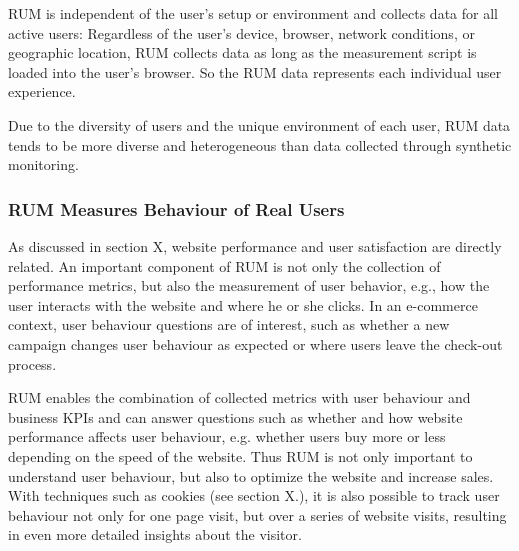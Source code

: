 
RUM is independent of the user's setup or environment and collects data for all active users:
Regardless of the user's device, browser, network conditions, or geographic location, RUM collects data as long as the measurement script is loaded into the user's browser.%
So the RUM data represents each individual user experience. %

Due to the diversity of users and the unique environment of each user, RUM data tends to be more diverse and heterogeneous than data collected through synthetic monitoring. %


\subsubsection{RUM Measures Behaviour of Real Users} %



As discussed in section X, website performance and user satisfaction are directly related.
An important component of RUM is not only the collection of performance metrics, but also the measurement of user behavior, e.g., how the user interacts with the website and where he or she clicks. %
In an e-commerce context, user behaviour questions are of interest, such as whether a new campaign changes user behaviour as expected or where users leave the check-out process. %

RUM enables the combination of collected metrics with user behaviour and business KPIs and can answer questions such as whether and how website performance affects user behaviour, e.g. whether users buy more or less depending on the speed of the website. %
Thus RUM is not only important to understand user behaviour, but also to optimize the website and increase sales.
With techniques such as cookies (see section X.), it is also possible to track user behaviour not only for one page visit, but over a series of website visits, resulting in even more detailed insights about the visitor. %


